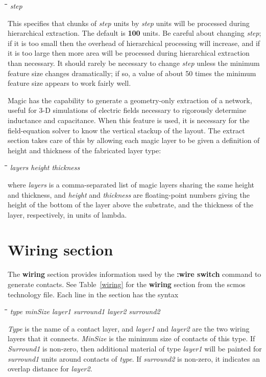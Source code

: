 \documentclass[letterpaper,twoside,12pt]{article}
\def\hinch{\hspace*{0.5in}}
\def\starti{\begin{center}\begin{tabbing}\hinch\=\hinch\=\hinch\=\hinch\=\kill}
\def\endi{\end{tabbing}\end{center}}
\def\ii{\>\>\>}
\begin{document}
\starti
   \ii {\bfseries step} {\itshape step}
\endi

This specifies that chunks of {\itshape step} units by {\itshape step} units
will be processed during hierarchical extraction.  The default
is {\bfseries 100} units.
Be careful about changing {\itshape step}; if it is too small then
the overhead of hierarchical processing will increase, and if
it is too large then more area will be processed during
hierarchical extraction than necessary.
It should rarely be necessary to change {\itshape step} unless the
minimum feature size changes dramatically; if so, a value of about
50 times the minimum feature size appears to work fairly well.

Magic has the capability to generate a geometry-only extraction of a
network, useful for 3-D simulations of electric fields necessary to
rigorously determine inductance and capacitance.  When this feature
is used, it is necessary for the field-equation solver to know the
vertical stackup of the layout.  The extract section takes care of
this by allowing each magic layer to be given a definition of
height and thickness of the fabricated layer type:

\starti
   \ii {\bfseries height} {\itshape layers height thickness}
\endi

where {\itshape layers} is a comma-separated list of magic layers
sharing the same height and thickness, and {\itshape height} and
{\itshape thickness} are floating-point numbers giving the height
of the bottom of the layer above the substrate, and the thickness
of the layer, respectively, in units of lambda.

\section{Wiring section}

The {\bfseries wiring} section provides information used by the
{\bfseries :wire switch} command to generate contacts.
See Table~\ref{wiring} for the {\bfseries wiring} section from the scmos
technology file.  Each line in the section has the syntax

\starti
   \ii {\bfseries contact} {\itshape type minSize layer1 surround1 layer2 surround2} \\
\endi

{\itshape Type} is the name of a contact layer, and {\itshape layer1} and
{\itshape layer2}
are the two wiring layers that it connects.  {\itshape MinSize} is the
minimum size of contacts of this type.  If {\itshape Surround1} is non-zero,
then additional material of type {\itshape layer1} will be painted for
{\itshape surround1} units around contacts of {\itshape type}.  If {\itshape surround2}
is non-zero, it indicates an overlap distance for {\itshape layer2}.
\end{document}
